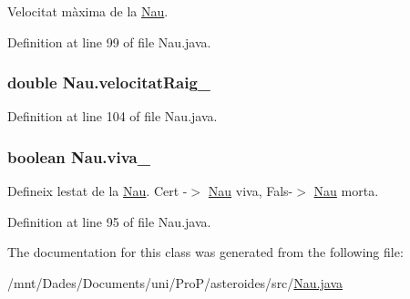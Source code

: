 Velocitat màxima de la \hyperlink{class_nau}{Nau}. 



Definition at line 99 of file Nau.\+java.

\hypertarget{class_nau_a1400505da3bafa2056c8e542a7811b33}{}
\subsubsection[{velocitat\+Raig\+\_\+}]{\setlength{\rightskip}{0pt plus 5cm}double Nau.\+velocitat\+Raig\+\_\+\hspace{0.3cm}{\ttfamily [protected]}}\label{class_nau_a1400505da3bafa2056c8e542a7811b33}


Definition at line 104 of file Nau.\+java.

\hypertarget{class_nau_a165d7613744bb71f472d6bc56aa65540}{}
\subsubsection[{viva\+\_\+}]{\setlength{\rightskip}{0pt plus 5cm}boolean Nau.\+viva\+\_\+\hspace{0.3cm}{\ttfamily [private]}}\label{class_nau_a165d7613744bb71f472d6bc56aa65540}


Defineix l\textquotesingle{}estat de la \hyperlink{class_nau}{Nau}. Cert -\/$>$ \hyperlink{class_nau}{Nau} viva, Fals-\/$>$ \hyperlink{class_nau}{Nau} morta. 



Definition at line 95 of file Nau.\+java.



The documentation for this class was generated from the following file\+:\begin{DoxyCompactItemize}
\item 
/mnt/\+Dades/\+Documents/uni/\+Pro\+P/asteroides/src/\hyperlink{_nau_8java}{Nau.\+java}\end{DoxyCompactItemize}
